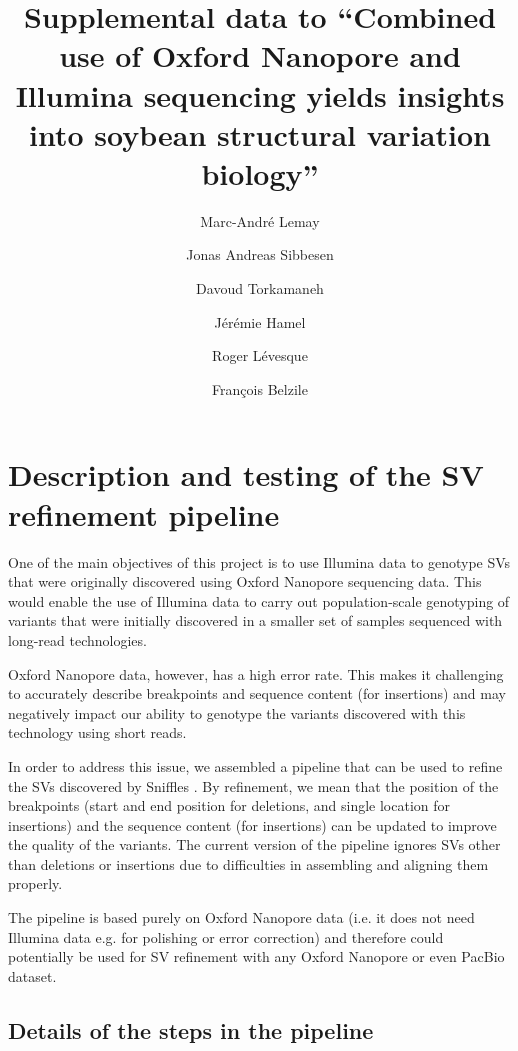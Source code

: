 \documentclass[12pt]{article}
\title{Supplemental data to ``Combined use of Oxford Nanopore and Illumina sequencing yields insights into soybean structural variation biology''}
\author{Marc-André Lemay \and Jonas Andreas Sibbesen \and Davoud Torkamaneh \and Jérémie Hamel \and Roger Lévesque \and François Belzile}
\date{}
\begin{document}
\maketitle \thispagestyle{empty}

\tableofcontents

\vspace{4ex}

\listoftables

\thispagestyle{empty}
\clearpage

\listoffigures

\thispagestyle{empty}

\clearpage

\section{Description and testing of the SV refinement pipeline}

One of the main objectives of this project is to use Illumina data to genotype SVs that were originally discovered using Oxford Nanopore sequencing data. 
This would enable the use of Illumina data to carry out population-scale genotyping of variants that were initially discovered in a smaller set of samples sequenced with long-read technologies.

Oxford Nanopore data, however, has a high error rate.
This makes it challenging to accurately describe breakpoints and sequence content (for insertions) and may negatively impact our ability to genotype the variants discovered with this technology using short reads.

In order to address this issue, we assembled a pipeline that can be used to refine the SVs discovered by Sniffles \citep{ngmlr}.
By refinement, we mean that the position of the breakpoints (start and end position for deletions, and single location for insertions) and the sequence content (for insertions) can be updated to improve the quality of the variants. 
The current version of the pipeline ignores SVs other than deletions or insertions due to difficulties in assembling and aligning them properly.

The pipeline is based purely on Oxford Nanopore data (i.e. it does not need Illumina data e.g. for polishing or error correction) and therefore could potentially be used for SV refinement with any Oxford Nanopore or even PacBio dataset.

\subsection{Details of the steps in the pipeline}
\end{document}
